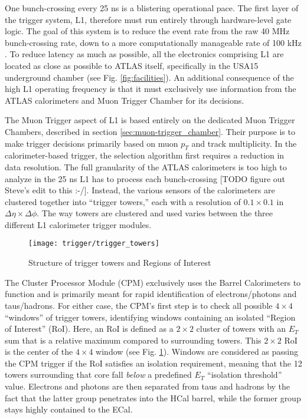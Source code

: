         One bunch-crossing every 25 ns is a blistering operational pace.
        The first layer of the trigger system, L1, therefore must run entirely through hardware-level gate logic.
        The goal of this system is to reduce the event rate from the raw 40 MHz bunch-crossing rate,
            down to a more computationally manageable rate of 100 kHz \cite{trigger_run2}.
        To reduce latency as much as possible, all the electronics comprising L1 are located as close as possible to ATLAS itself, specifically in the USA15 underground chamber \cite{trigger_tdr} (see Fig. \ref{fig:facilities}).
        An additional consequence of the high L1 operating frequency
            is that it must exclusively use information from the ATLAS calorimeters and Muon Trigger Chamber for its decisions.

        The Muon Trigger aspect of L1 is based entirely on the dedicated Muon Trigger Chambers, described in section \ref{sec:muon-trigger_chamber}.
        Their purpose is to make trigger decisions primarily based on muon $p_T$ and track multiplicity\cite{trigger_run1}.
        In the calorimeter-based trigger, the selection algorithm first requires a reduction in data resolution.
        The full granularity of the ATLAS calorimeters is too high to analyze in the 25 ns L1 has to process each bunch-crossing
            [TODO figure out Steve's edit to this :-/].
        Instead, the various sensors of the calorimeters are clustered together into ``trigger towers,''
            each with a resolution of $0.1 \times 0.1$ in $\Delta \eta \times \Delta \phi$.
        The way towers are clustered and used varies between the three different L1 calorimeter trigger modules.

        \begin{figure}[h]
            \texttt{[image: trigger/trigger\_towers]}
            \caption{Structure of trigger towers and Regions of Interest \cite{L1_calo_run1}}
            \label{fig:trigger_towers}
        \end{figure}


        The Cluster Processor Module (CPM) exclusively uses the Barrel Calorimeters to function
            and is primarily meant for rapid identification of electrons/photons and taus/hadrons.
        For either case, the CPM's first step is to check all possible $4 \times 4$ ``windows'' of trigger towers, identifying windows containing an isolated ``Region of Interest'' (RoI).
        Here, an RoI is defined as a $2 \times 2$ cluster of towers with an $E_T$ sum that is a relative maximum compared to surrounding towers.
        This $2 \times 2$ RoI is the center of the $4 \times 4$ window (see Fig. \ref{fig:trigger_towers}).
        Windows are considered as passing the CPM trigger if the RoI satisfies an isolation requirement, meaning that the 12 towers surrounding that core fall \textit{below} a predefined $E_T$ ``isolation threshold'' value.
        Electrons and photons are then separated from taus and hadrons by the fact that the latter group penetrates into the HCal barrel, while the former group stays highly contained to the ECal.

